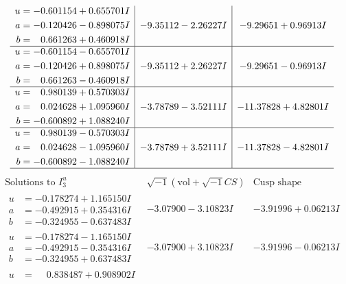 \documentclass[1p]{elsarticle_modified}
\theoremstyle{definition}
\newcommand{\I}{\sqrt{-1}}
\begin{document}
$$\begin{array}{c|c|c}
\begin{aligned}
u &= -0.601154 + 0.655701 I \\
a &= -0.120426 - 0.898075 I \\
b &= \phantom{-}0.661263 + 0.460918 I\end{aligned}
 & -9.35112 - 2.26227 I & -9.29651 + 0.96913 I \\ \hline\begin{aligned}
u &= -0.601154 - 0.655701 I \\
a &= -0.120426 + 0.898075 I \\
b &= \phantom{-}0.661263 - 0.460918 I\end{aligned}
 & -9.35112 + 2.26227 I & -9.29651 - 0.96913 I \\ \hline\begin{aligned}
u &= \phantom{-}0.980139 + 0.570303 I \\
a &= \phantom{-}0.024628 + 1.095960 I \\
b &= -0.600892 + 1.088240 I\end{aligned}
 & -3.78789 - 3.52111 I & -11.37828 + 4.82801 I \\ \hline\begin{aligned}
u &= \phantom{-}0.980139 - 0.570303 I \\
a &= \phantom{-}0.024628 - 1.095960 I \\
b &= -0.600892 - 1.088240 I\end{aligned}
 & -3.78789 + 3.52111 I & -11.37828 - 4.82801 I\\
 \hline 
 \end{array}$$\newpage$$\begin{array}{c|c|c}  
\text{Solutions to }I^u_{3}& \I (\text{vol} + \sqrt{-1}CS) & \text{Cusp shape}\\
 \hline 
\begin{aligned}
u &= -0.178274 + 1.165150 I \\
a &= -0.492915 + 0.354316 I \\
b &= -0.324955 - 0.637483 I\end{aligned}
 & -3.07900 - 3.10823 I & -3.91996 + 0.06213 I \\ \hline\begin{aligned}
u &= -0.178274 - 1.165150 I \\
a &= -0.492915 - 0.354316 I \\
b &= -0.324955 + 0.637483 I\end{aligned}
 & -3.07900 + 3.10823 I & -3.91996 - 0.06213 I \\ \hline\begin{aligned}
u &= \phantom{-}0.838487 + 0.908902 I \\

\end{aligned}
\end{array}$$
\end{document}
